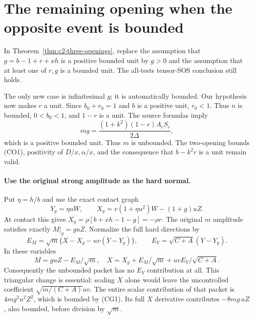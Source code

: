 \section{The remaining opening when the opposite event is bounded}
\label{sec:c2-last-opening}

\begin{theorem}
\label{thm:c2-no-opening-bounds}
In Theorem~\ref{thm:c2-three-openings}, replace the assumption that
$g=b-1+r+xh$ is a positive bounded unit by $g>0$ and the assumption that at least one of $r,g$ is a bounded
unit.  The all-tests tensor-SOS conclusion still holds.
\end{theorem}

The only new case is infinitesimal $g$; it is automatically bounded.
Our hypothesis now makes $r$ a unit.  Since $b_0+r_0=1$ and $b$ is
a positive unit, $r_0<1$.  Thus $n$ is bounded,
$0<b_0<1$, and $1-r$ is a unit.  The source formulas imply
\[
               mg=\frac{(1+k^2)(1-r)A_cS_c}{2\Delta},   \tag{CG1}
\]
which is a positive bounded unit.  Thus $m$ is unbounded.  The
two-opening bounds (CO1), positivity of $D/x,\alpha/x$, and the
consequence that $b-k^2r$ is a unit remain valid.

\paragraph{Use the original strong amplitude as the hard normal.}
Put $\eta=h/b$ and use the exact contact graph
\[
 Y_g=\eta uW,\qquad
 X_g=v(1+\eta u^2)W-(1+g)uZ.                            \tag{CG2}
\]
At contact this gives $X_g=\rho[b+xh-1-g]=-\rho r$.
The original $m$ amplitude satisfies exactly $M|_g=guZ$.
Normalize the full hard directions by
\[
 E_M=\sqrt m\{X-X_g-uv(Y-Y_g)\},\qquad
 E_Y=\sqrt{C+A}(Y-Y_g).                                 \tag{CG3}
\]
In these variables
\[
 M=guZ-E_M/\sqrt m,
 \quad
 X=X_g+E_M/\sqrt m+uvE_Y/\sqrt{C+A}.
\]
Consequently the unbounded packet has no $E_Y$ contribution at all.
This triangular change is essential: scaling $X$ alone would leave
the uncontrolled coefficient $\sqrt{m/(C+A)}uv$.
The entire scalar contribution of that packet is $4mg^2u^2Z^2$,
which is bounded by (CG1).  Its full $X$ derivative contributes
$-8mg\,uZ$, also bounded, before division by $\sqrt m$.

